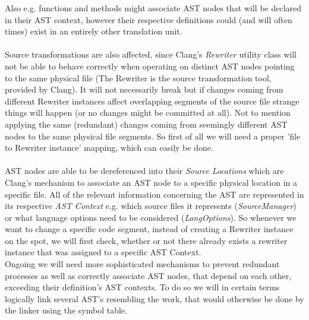 Also e.g. functions and methods might associate AST nodes that will be declared in their AST context, however their respective definitions could (and will often times) exist in an entirely other translation unit.\\\\
Source transformations are also affected, since Clang's \textit{Rewriter} utility class will not be able to behave correctly when operating on distinct AST nodes pointing to the same physical file (The Rewriter is the source transformation tool, provided by Clang). It will not necessarily break but if changes coming from different Rewriter instances affect overlapping segments of the source file strange things will happen (or no changes might be committed at all). Not to mention applying the same (redundant) changes coming from seemingly different AST nodes to the same physical file segments. So first of all we will need a proper 'file to Rewriter instance' mapping, which can easily be done.\\\\
AST nodes are able to be dereferenced into their \textit{Source Locations} which are Clang's mechanism to associate an AST node to a specific physical location in a specific file. All of the relevant information concerning the AST are represented in its respective \textit{AST Context} e.g. which source files it represents (\textit{SourceManager}) or what language options need to be considered (\textit{LangOptions}). So whenever we want to change a specific code segment, instead of creating a Rewriter instance on the spot, we will first check, whether or not there already exists a rewriter instance that was assigned to a specific AST Context.\\
Ongoing we will need more sophisticated mechanisms to prevent redundant processes as well as correctly associate AST nodes, that depend on each other, exceeding their definition's AST contexts. To do so we will in certain terms logically link several AST's resembling the work, that would otherwise be done by the linker using the symbol table.

